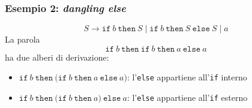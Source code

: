 


\begin{frame}
        \frametitle{Esempio 2: \emph{dangling else}}
        \[
                S \to \texttt{if}\ b\ \texttt{then}\ S
                \mid \texttt{if}\ b\ \texttt{then}\ S\ \texttt{else}\ S
                \mid a
        \]
        La parola
        \[
                \texttt{if}\ b\ \texttt{then}\ \texttt{if}\ b\ \texttt{then}\ a\ \texttt{else}\ a
        \]
        ha due alberi di derivazione:
        \begin{itemize}
                \item
                $\texttt{if}\ b\ \texttt{then}\ \bigl(\texttt{if}\ b\ \texttt{then}\ a\ \texttt{else}\ a\bigr)$:
                l'\texttt{else} appartiene all'\texttt{if} interno
                \item
                $\texttt{if}\ b\ \texttt{then}\ \bigl(\texttt{if}\ b\ \texttt{then}\ a\bigr)\ \texttt{else}\ a$:
                l'\texttt{else} appartiene all'\texttt{if} esterno
        \end{itemize}
\end{frame}


